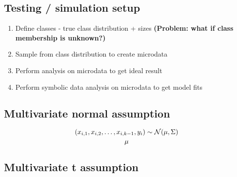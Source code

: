 \documentclass[11pt,paper=a4,numbers=noendperiod]{scrartcl} %
\begin{document}
\subsection{Testing / simulation setup}
\begin{enumerate}
    \item Define classes - true class distribution + sizes \newline
        \textbf{(Problem: what if class membership is unknown?)}
    \item Sample from class distribution to create microdata
    \item Perform analysis on microdata to get ideal result
    \item Perform symbolic data analysis on microdata to get model fits
\end{enumerate}


\subsection{Multivariate normal assumption}
\begin{equation}
    \left(x_{i, 1}, x_{i, 2}, \ldots, x_{i, k-1}, y_i \right) \sim
    \mathcal{N}(\mathbf{\mu}, \Sigma)
\end{equation}
\begin{equation}
    \mathbf{\mu}
\end{equation}

\subsection{Multivariate t assumption}
\end{document}
